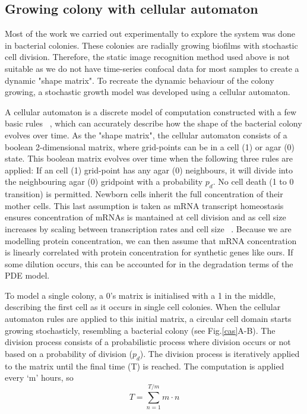 \subsection{Growing colony with cellular automaton}
Most of the work we carried out experimentally to explore the system was done in bacterial colonies.
These colonies are radially growing biofilms with stochastic cell division.
Therefore, the static image recognition method used above is not suitable as we do not have time-series confocal data for most samples to create a dynamic "shape matrix".
To recreate the dynamic behaviour of the colony growing, a stochastic growth model was developed using a cellular automaton.

A cellular automaton is a discrete model of computation constructed with a few basic rules ~\parencite{gardner1970mathematical}, which can accurately describe how the shape of the bacterial colony evolves over time.
As the "shape matrix", the cellular automaton consists of a boolean 2-dimensional matrix, where grid-points can be in a cell (1) or agar (0) state.
This boolean matrix evolves over time when the following three rules are applied: If an cell (1) grid-point has any agar (0) neighbours, it will divide into the neighbouring agar (0) gridpoint with a probability $p_{d}$.
No cell death (1 to 0 transition) is permitted.
Newborn cells inherit the full concentration of their mother cells.
This last assumption is taken as mRNA transcript homeostasis ensures concentration of mRNAs is mantained at cell division and as cell size increases by scaling between transcription rates and cell size ~\parencite{berry2022mechanisms,volteras2023global}.
Because we are modelling protein concentration, we can then assume that mRNA concentration is linearly correlated with protein concentration for synthetic genes like ours.
If some dilution occurs, this can be accounted for in the degradation terms of the PDE model.

To model a single colony, a 0's matrix is initialised with a 1 in the middle, describing the first cell as it occurs in single cell colonies.
When the cellular automaton rules are applied to this initial matrix, a circular cell domain starts growing stochasticly, resembling a bacterial colony (see Fig.\ref{cas}A-B).
The division process consists of a probabilistic process where division occurs or not based on a probability of division ($p_{d}$).
The division process is iteratively applied to the matrix until the final time (T) is reached.
The computation is applied every ‘m’ hours, so
\begin{equation}
        T = \sum_{n=1}^{T/m} m\cdot n
\end{equation}

